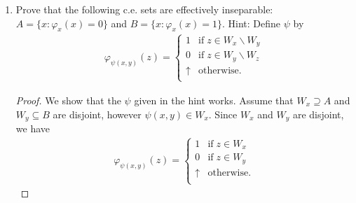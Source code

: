 \documentclass{article}
\begin{document}
\begin{enumerate}[label={\bf Q\arabic*:}]
\begin{enumerate}[label={(\roman*)}]
\begin{proof}
          Observe that if $W_{e_0}$ and $W_{e_1}$ are disjoint sets that
          separate $A$ and $B$, then this procedure will eventually
          terminate from effective inseparability of $(A,B)$: Otherwise
          $W_{e_0}$ union with a finite set is the complement of $W_{e_1}$,
          which will make $(A,B)$ computably separable, a contradiction. On
          the other hand, if $W_{e_0}$ and $W_{e_1}$ do not separate $A$
          and $B$ or are not disjoint, then because
          $\{\psi'(0),\ldots,\psi'(n)\}$ is finite, the procedure described
          will either eventually produce an output that has been produced
          before, or produce an output not in
          $\{\psi'(0),\ldots,\psi'(n)\}$. \\

          The above procedure can be defined formally as follows: Let
          $h(x)$ be a recursive function such that $W_{h(x)}=W_x\cup
          \{\psi(x)\}$. $h$ exists from SMN. To compute $\psi'(n+1)$,
          enumerate
          \[\{\psi(n+1), \psi h(n+1), \psi h^2(n+1),\ldots\}\]
          until either some $y$ not in $\{\psi'(0),\ldots,\psi'(n)\}$ is
          found, or a repetition occurs. Then set $\psi'(n+1)=y$. Note that
          $\psi'$ will be total recursive from the Church-Turing thesis.
        \end{proof}

      \item Prove that the following c.e. sets are effectively inseparable:
        $A=\{x:\varphi_x(x)=0\}$ and $B=\{x:\varphi_x(x)=1\}$. Hint: Define
        $\psi$ by
        \begin{align*}
          \varphi_{\psi(x,y)}(z)=
          \begin{cases}
            1 &\text{if}\; z\in W_x\backslash W_y\\
            0 &\text{if}\; z\in W_y\backslash W_z\\
            \uparrow &\text{otherwise}.\\
          \end{cases}
        \end{align*}

        \begin{proof}
          We show that the $\psi$ given in the hint works. Assume that
          $W_x\supseteq A$ and $W_y\subseteq B$ are disjoint, however
          $\psi(x,y)\in W_x$. Since $W_x$ and $W_y$ are disjoint, we have
          \begin{align*}
            \varphi_{\psi(x,y)}(z)=
            \begin{cases}
              1 &\text{if}\; z\in W_x\\
              0 &\text{if}\; z\in W_y\\
              \uparrow &\text{otherwise}.\\
            \end{cases}
          \end{align*}


\end{proof}
\end{enumerate}
\end{enumerate}
\end{document}
